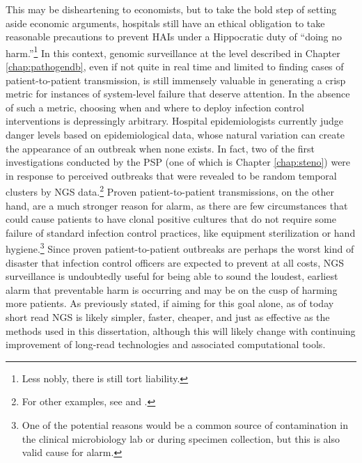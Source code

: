 This may be disheartening to economists, but to take the bold step of setting aside economic arguments, hospitals still have an ethical obligation to take reasonable precautions to prevent HAIs under a Hippocratic duty of ``doing no harm.''\footnote{Less nobly, there is still tort liability.} In this context, genomic surveillance at the level described in Chapter \ref{chap:pathogendb}, even if not quite in real time and limited to finding cases of patient-to-patient transmission, is still immensely valuable in generating a crisp metric for instances of system-level failure that deserve attention. In the absence of such a metric, choosing when and where to deploy infection control interventions is depressingly arbitrary. Hospital epidemiologists currently judge danger levels based on epidemiological data, whose natural variation can create the appearance of an outbreak when none exists. In fact, two of the first investigations conducted by the PSP (one of which is Chapter \ref{chap:steno}) were in response to perceived outbreaks that were revealed to be random temporal clusters by NGS data.\footnote{For other examples, see \textcite{Peaper2015} and \textcite{Anderson2014}.} Proven patient-to-patient transmissions, on the other hand, are a much stronger reason for alarm, as there are few circumstances that could cause patients to have clonal positive cultures that do not require some failure of standard infection control practices, like equipment sterilization or hand hygiene.\footnote{One of the potential reasons would be a common source of contamination in the clinical microbiology lab or during specimen collection, but this is also valid cause for alarm.} Since proven patient-to-patient outbreaks are perhaps the worst kind of disaster that infection control officers are expected to prevent at all costs, NGS surveillance is undoubtedly useful for being able to sound the loudest, earliest alarm that preventable harm is occurring and may be on the cusp of harming more patients. As previously stated, if aiming for this goal alone, as of today short read NGS is likely simpler, faster, cheaper, and just as effective as the methods used in this dissertation, although this will likely change with continuing improvement of long-read technologies and associated computational tools.

